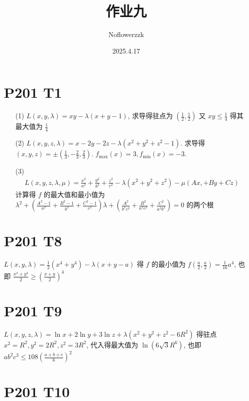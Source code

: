 \documentclass{article}
\title{作业九}
\author{Noflowerzzk}
\date{2025.4.17}
\begin{document}
\maketitle

\section*{P201 T1}

\begin{itemize}
    \item [(1)] $L(x, y, \lambda) = xy - \lambda(x + y - 1)$, 求导得驻点为 $\left(\frac{1}{2}, \frac{1}{2}\right)$ 又 $xy \leq \frac{1}{4}$ 得其最大值为 $\frac{1}{4}$
    \item [(2)] $L(x, y, z, \lambda) = x - 2y - 2z - \lambda(x^2 + y^2 + z^2 - 1)$. 求导得 $(x, y, z) = \pm \left(\frac{1}{3}, -\frac{2}{3}, \frac{2}{3}\right)$. $f_\mathrm{max}(x) = 3, f_\mathrm{min}(x) = -3$.
    \item [(3)] \begin{align*}
        L(x, y, z, \lambda, \mu) = \frac{x^2}{a^2} + \frac{y^2}{b^2} + \frac{z^2}{c^2} - \lambda(x^2 + y^2 + z^2) - \mu (Ax, + By + Cz)
    \end{align*}
    计算得 $f$ 的最大值和最小值为 $\lambda^2 + \left(\frac{A^2 - 1}{a^2} + \frac{B^2 - 1}{b^2} + \frac{C^2 - 1}{c^2}\right)\lambda + \left(\frac{A^2}{b^2c^2} + \frac{B^2}{a^2c^2} + \frac{C^2}{a^2b^2}\right) = 0$ 的两个根
\end{itemize}

\section*{P201 T8}

$L(x, y, \lambda) = \frac{1}{2}(x^4 + y^4) - \lambda (x + y - a)$ 得 $f$ 的最小值为 $f\left(\frac{a}{2}, \frac{a}{2}\right) = \frac{1}{16}a^4$, 也即 $\frac{x^4 + y^4}{2} \geq \left(\frac{x + y}{2}\right)^4$

\section*{P201 T9}

$L(x, y, z, \lambda) = \ln x + 2\ln y + 3 \ln z + \lambda(x^2 + y^2 + z^2 - 6R^2)$ 得驻点 $x^2 = R^2, y^2 = 2R^2, z^2 = 3R^2$, 代入得最大值为 $\ln \left(6\sqrt{3}R^6\right)$, 也即 $ab^2c^3 \leq 108\left(\frac{a + b + c}{6}\right)^2$

\section*{P201 T10}
\end{document}
